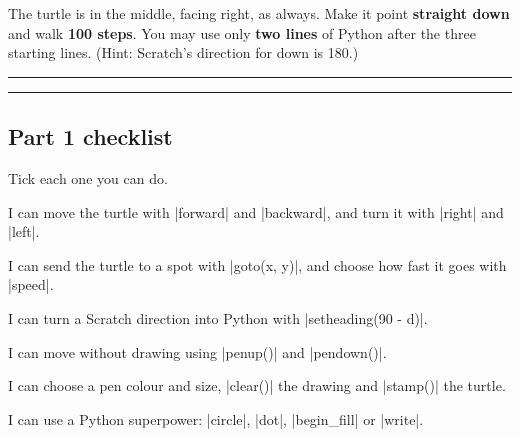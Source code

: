 \begin{puzzle}
The turtle is in the middle, facing right, as always. Make it point \textbf{straight down} and walk \textbf{100 steps}. You may use only \textbf{two lines} of Python after the three starting lines. (Hint: Scratch's direction for down is 180.)

\vspace{6pt}
\rule{\linewidth}{0.4pt}\par\vspace{12pt}
\rule{\linewidth}{0.4pt}
\end{puzzle}

\subsection*{Part 1 checklist}

Tick each one you can do.

\tick I can move the turtle with \py|forward| and \py|backward|, and turn it with \py|right| and \py|left|.\par
\tick I can send the turtle to a spot with \py|goto(x, y)|, and choose how fast it goes with \py|speed|.\par
\tick I can turn a Scratch direction into Python with \py|setheading(90 - d)|.\par
\tick I can move without drawing using \py|penup()| and \py|pendown()|.\par
\tick I can choose a pen colour and size, \py|clear()| the drawing and \py|stamp()| the turtle.\par
\tick I can use a Python superpower: \py|circle|, \py|dot|, \py|begin_fill| or \py|write|.
